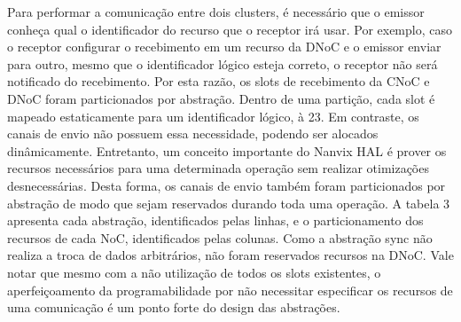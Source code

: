 		Para performar a comunicação entre dois clusters, é necessário que o emissor conheça qual o identificador do recurso que o receptor irá usar.
		Por exemplo, caso o receptor configurar o recebimento em um recurso da DNoC e o emissor enviar para outro, mesmo que o identificador lógico esteja correto, o receptor não será notificado do recebimento.
		Por esta razão, os slots de recebimento da CNoC e DNoC foram particionados por abstração.
		Dentro de uma partição, cada slot é mapeado estaticamente para um identificador lógico,  à 23.
		Em contraste, os canais de envio não possuem essa necessidade, podendo ser alocados dinâmicamente.
		Entretanto, um conceito importante do Nanvix HAL é prover os recursos necessários para uma determinada operação sem realizar otimizações desnecessárias.
		Desta forma, os canais de envio também foram particionados por abstração de modo que sejam reservados durando toda uma operação.
		A tabela 3 apresenta cada abstração, identificados pelas linhas, e o particionamento dos recursos de cada NoC, identificados pelas colunas.
		Como a abstração sync não realiza a troca de dados arbitrários, não foram reservados recursos na DNoC.
		Vale notar que mesmo com a não utilização de todos os slots existentes, o aperfeiçoamento da programabilidade por não necessitar especificar os recursos de uma comunicação é um ponto forte do design das abstrações.


